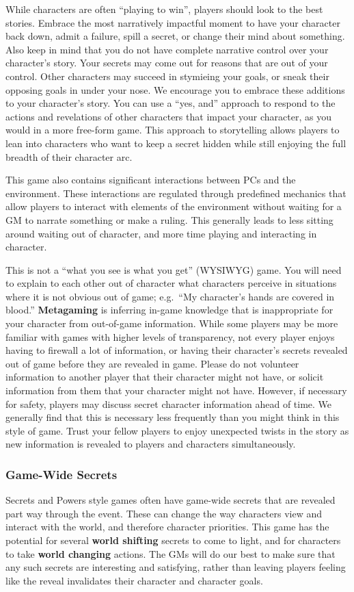 \documentclass[sheet]{GL2020}
\begin{document}
While characters are often ``playing to win'', players should look to the best stories. Embrace the most narratively impactful moment to have your character back down, admit a failure, spill a secret, or change their mind about something. Also keep in mind that you do not have complete narrative control over your character's story. Your secrets may come out for reasons that are out of your control. Other characters may succeed in stymieing your goals, or sneak their opposing goals in under your nose. We encourage you to embrace these additions to your character's story. You can use a ``yes, and'' approach to respond to the actions and revelations of other characters that impact your character, as you would in a more free-form game. This approach to storytelling allows players to lean into characters who want to keep a secret hidden while still enjoying the full breadth of their character arc.

This game also contains significant interactions between PCs and the environment. These interactions are regulated through predefined mechanics that allow players to interact with elements of the environment without waiting for a GM to narrate something or make a ruling. This generally leads to less sitting around waiting out of character, and more time playing and interacting in character. 

This is not a ``what you see is what you get'' (WYSIWYG) game. You will need to explain to each other out  of character what characters perceive in situations where it is not obvious out of game; e.g.\ ``My character's hands are covered in blood.'' {\bf Metagaming} is inferring in-game knowledge that is inappropriate for your character from out-of-game information. While some players may be more familiar with games with higher levels of transparency, not every player enjoys having to firewall a lot of information, or having their character's secrets revealed out of game before they are revealed in game. Please do not volunteer information to another player that their character might not have, or solicit information from them that your character might not have. However, if necessary for safety, players may discuss secret character information ahead of time. We generally find that this is necessary less frequently than you might think in this style of game. Trust your fellow players to enjoy unexpected twists in the story as new information is revealed to players and characters simultaneously.

\subsubsection{Game-Wide Secrets}
Secrets and Powers style games often have game-wide secrets that are revealed part way through the event. These can change the way characters view and interact with the world, and therefore character priorities. This game has the potential for several \textbf{world shifting} secrets to come to light, and for characters to take \textbf{world changing} actions. The GMs will do our best to make sure that any such secrets are interesting and satisfying, rather than leaving players feeling like the reveal invalidates their character and character goals. 
\end{document}
